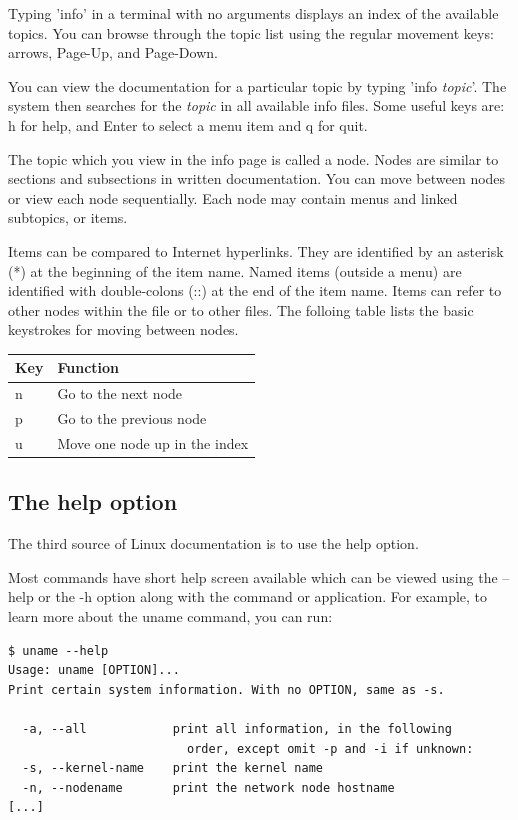 \documentclass[11pt,a4paper,twoside]{article}
\begin{document}
Typing 'info' in a terminal with no arguments displays an index of the
available topics. You can browse through the topic list using the regular
movement keys: arrows, Page-Up, and Page-Down.

You can view the documentation for a particular topic by typing 'info 
\textsl{topic}'. The system then searches for the \textsl{topic} in all 
available info files. Some useful keys are: h for help, and Enter to select 
a menu item and q for quit.

The topic which you view in the info page is called a node. Nodes are 
similar to sections and subsections in written documentation. You can 
move between nodes or view each node sequentially. Each node may contain 
menus and linked subtopics, or items.

Items can be compared to Internet hyperlinks. They are identified by an
asterisk (*) at the beginning of the item name. Named items (outside a
menu) are identified with double-colons (::) at the end of the item name.
Items can refer to other nodes within the file or to other files. The
folloing table lists the basic keystrokes for moving between nodes.

\begin{center}
\begin{tabular}{ l | l }
\hline
Key &  Function \\
\hline
n & Go to the next node \\
p & Go to the previous node \\
u & Move one node up in the index \\
\hline
\end{tabular}
\end{center}


\subsection{The help option}

The third source of Linux documentation is to use the help option.

Most commands have short help screen available which can be viewed 
using the --help or the -h option along with the command or application.
For example, to learn more about the uname command, you can run:
\begin{lstlisting}[frame=single]
$ uname --help
Usage: uname [OPTION]...
Print certain system information. With no OPTION, same as -s.

  -a, --all            print all information, in the following 
                         order, except omit -p and -i if unknown:
  -s, --kernel-name    print the kernel name
  -n, --nodename       print the network node hostname
[...]
\end{lstlisting}
\end{document}
